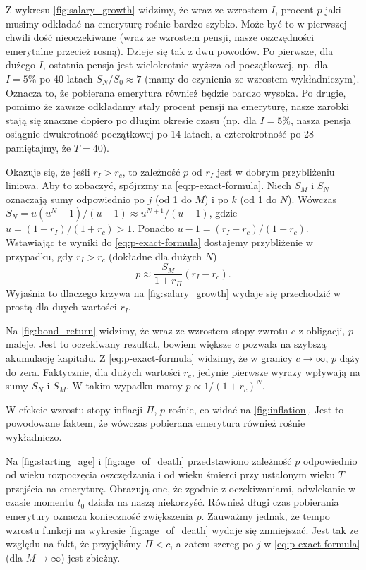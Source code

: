 \documentclass{article}
\begin{document}
Z wykresu \autoref{fig:salary_growth} widzimy, że wraz ze wzrostem $I$, procent $p$ jaki musimy odkładać na emeryturę rośnie bardzo szybko.
Może być to w pierwszej chwili dość nieoczekiwane (wraz ze wzrostem pensji, nasze oszczędności emerytalne przecież rosną).
Dzieje się tak z dwu powodów.
Po pierwsze, dla dużego $I$, ostatnia pensja jest wielokrotnie wyższa od początkowej, np. dla $I = 5\%$ po 40 latach $S_N/S_0 \approx 7$ (mamy do czynienia ze wzrostem wykładniczym).
Oznacza to, że pobierana emerytura również będzie bardzo wysoka.
Po drugie, pomimo że zawsze odkładamy stały procent pensji na emeryturę, nasze zarobki stają się znaczne dopiero po długim okresie czasu (np. dla $I=5\%$, nasza pensja osiągnie dwukrotność początkowej po 14 latach, a czterokrotność po 28 -- pamiętajmy, że $T=40$).

Okazuje się, że jeśli $r_I > r_c$, to zależność $p$ od $r_I$ jest w dobrym przybliżeniu liniowa.
Aby to zobaczyć, spójrzmy na \autoref{eq:p-exact-formula}.
Niech $S_M$ i $S_N$ oznaczają sumy odpowiednio po $j$ (od 1 do $M$) i po $k$ (od 1 do $N$).
Wówczas $S_N = u (u^N - 1)/(u-1) \approx u^{N+1}/(u - 1)$, gdzie $u = (1+r_I) / (1+r_c) > 1$.
Ponadto $u-1 = (r_I - r_c) / (1+r_c)$.
Wstawiając te wyniki do \autoref{eq:p-exact-formula} dostajemy przybliżenie w przypadku, gdy $r_I > r_c$ (dokładne dla dużych $N$)
\begin{equation*}
    p \approx \frac{S_M}{1+r_\Pi}(r_I - r_c).
\end{equation*}
Wyjaśnia to dlaczego krzywa na \autoref{fig:salary_growth} wydaje się przechodzić w prostą dla duych wartości $r_I$.

Na \autoref{fig:bond_return} widzimy, że wraz ze wzrostem stopy zwrotu $c$ z obligacji, $p$ maleje.
Jest to oczekiwany rezultat, bowiem większe $c$ pozwala na szybszą akumulację kapitału.
Z \autoref{eq:p-exact-formula} widzimy, że w granicy $c \to \infty$, $p$ dąży do zera.
Faktycznie, dla dużych wartości $r_c$, jedynie pierwsze wyrazy wpływają na sumy $S_N$ i $S_M$.
W takim wypadku mamy $p \propto 1/(1+r_c)^N$.

W efekcie wzrostu stopy inflacji $\Pi$, $p$ rośnie, co widać na \autoref{fig:inflation}.
Jest to powodowane faktem, że wówczas pobierana emerytura również rośnie wykładniczo.


Na \autoref{fig:starting_age} i \autoref{fig:age_of_death} przedstawiono zależność $p$ odpowiednio od wieku rozpoczęcia oszczędzania i od wieku śmierci przy ustalonym wieku $T$ przejścia na emeryturę.
Obrazują one, że zgodnie z oczekiwaniami, odwlekanie w czasie momentu $t_0$ działa na naszą niekorzyść.
Również długi czas pobierania emerytury oznacza konieczność zwiększenia $p$.
Zauważmy jednak, że tempo wzrostu funkcji na wykresie \autoref{fig:age_of_death} wydaje się zmniejszać.
Jest tak ze względu na fakt, że przyjęliśmy $\Pi < c$, a zatem szereg po $j$ w \autoref{eq:p-exact-formula} (dla $M \to \infty$) jest zbieżny.
\end{document}
